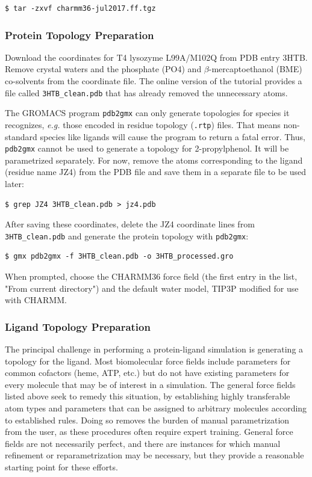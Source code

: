 \documentclass[9pt,tutorial]{livecoms}
\begin{document}
\begin{verbatim}
$ tar -zxvf charmm36-jul2017.ff.tgz
\end{verbatim}

\subsubsection{Protein Topology Preparation} \label{complex_top}

Download the coordinates for T4 lysozyme L99A/M102Q from PDB entry 3HTB. Remove crystal waters and the phosphate (PO4) and $\beta$-mercaptoethanol (BME) co-solvents from the coordinate file. The online version of the tutorial provides a file called \texttt{3HTB\_clean.pdb} that has already removed the unnecessary atoms.

The GROMACS program \texttt{pdb2gmx} can only generate topologies for species it recognizes, {\em e.g.} those encoded in residue topology (\texttt{.rtp}) files. That means non-standard species like ligands will cause the program to return a fatal error. Thus, \texttt{pdb2gmx} cannot be used to generate a topology for 2-propylphenol. It will be parametrized separately. For now, remove the atoms corresponding to the ligand (residue name JZ4) from the PDB file and save them in a separate file to be used later:

\begin{verbatim}
$ grep JZ4 3HTB_clean.pdb > jz4.pdb
\end{verbatim}

After saving these coordinates, delete the JZ4 coordinate lines from \texttt{3HTB\_clean.pdb} and generate the protein topology with \texttt{pdb2gmx}:

\begin{verbatim}
$ gmx pdb2gmx -f 3HTB_clean.pdb -o 3HTB_processed.gro
\end{verbatim}

When prompted, choose the CHARMM36 force field (the first entry in the list, "From current directory") and the default water model, TIP3P modified for use with CHARMM.

\subsubsection{Ligand Topology Preparation} \label{complex_lig_top}

The principal challenge in performing a protein-ligand simulation is generating a topology for the ligand. Most biomolecular force fields include parameters for common cofactors (heme, ATP, etc.) but do not have existing parameters for every molecule that may be of interest in a simulation. The general force fields listed above seek to remedy this situation, by establishing highly transferable atom types and parameters that can be assigned to arbitrary molecules according to established rules. Doing so removes the burden of manual parametrization from the user, as these procedures often require expert training. General force fields are not necessarily perfect, and there are instances for which manual refinement or reparametrization may be necessary, but they provide a reasonable starting point for these efforts.
\end{document}
